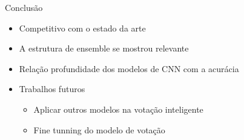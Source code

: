 \begin{frame}{Conclusão}
    
    \begin{itemize}
        \item Competitivo com o estado da arte
        \item A estrutura de ensemble se mostrou relevante
        \item Relação profundidade dos modelos de CNN com a acurácia
    \end{itemize}
    
    \begin{itemize}
        \item Trabalhos futuros
        \begin{itemize}
            \item Aplicar outros modelos na votação inteligente
            \item Fine tunning do modelo de votação
        \end{itemize}
    \end{itemize}
    
\end{frame}